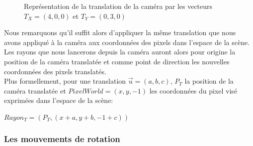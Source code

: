 \documentclass[11pt]{article}
\begin{document}
\begin{figure}[h!]
	
	\caption{Représentation de la translation de la caméra par les vecteurs $T_X = (4, 0, 0)$ et $T_Y = (0, 3, 0)$}
	\label{translationCameraFigure}
\end{figure}
\FloatBarrier

Nous remarquons qu'il suffit alors d'appliquer la même translation que nous avons appliqué à la caméra aux coordonnées des pixels dans l'espace de la scène. Les rayons que nous lancerons depuis la caméra auront alors pour origine la position de la caméra translatée et comme point de direction les nouvelles coordonnées des pixels translatés.\\
Plus formellement, pour une translation $\overrightarrow{u} = (a, b, c)$, $P_T$ la position de la caméra translatée et $PixelWorld = (x, y, -1)$ les coordonnées du pixel visé exprimées dans l'espace de la scène:

\begin{center}
	$Rayon_T = (P_T, (x + a, y + b, -1 + c))$
\end{center}

\subsubsection{Les mouvements de rotation}
\end{document}
